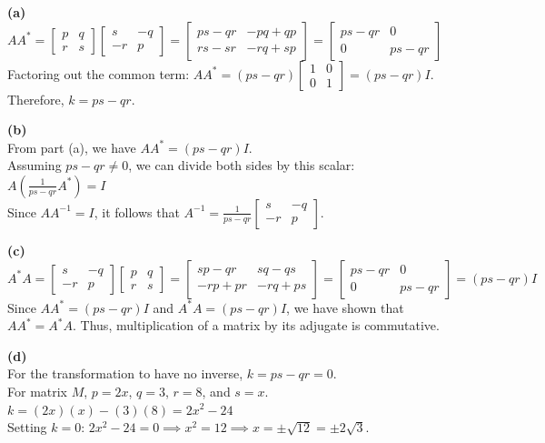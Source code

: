 \begin{solution}
\textbf{(a)} \\
$A A^* = \begin{bmatrix} p & q \\ r & s \end{bmatrix} \begin{bmatrix} s & -q \\ -r & p \end{bmatrix} = \begin{bmatrix} ps-qr & -pq+qp \\ rs-sr & -rq+sp \end{bmatrix} = \begin{bmatrix} ps-qr & 0 \\ 0 & ps-qr \end{bmatrix}$ \\
Factoring out the common term: $A A^* = (ps-qr)\begin{bmatrix} 1 & 0 \\ 0 & 1 \end{bmatrix} = (ps-qr)I$. \\
Therefore, $k = ps - qr$.

\medskip
\textbf{(b)} \\
From part (a), we have $A A^* = (ps-qr)I$. \\
Assuming $ps-qr \neq 0$, we can divide both sides by this scalar: \\
$A \left( \frac{1}{ps-qr} A^* \right) = I$ \\
Since $A A^{-1} = I$, it follows that $A^{-1} = \frac{1}{ps-qr} \begin{bmatrix} s & -q \\ -r & p \end{bmatrix}$.

\medskip
\textbf{(c)} \\
$A^* A = \begin{bmatrix} s & -q \\ -r & p \end{bmatrix} \begin{bmatrix} p & q \\ r & s \end{bmatrix} = \begin{bmatrix} sp-qr & sq-qs \\ -rp+pr & -rq+ps \end{bmatrix} = \begin{bmatrix} ps-qr & 0 \\ 0 & ps-qr \end{bmatrix} = (ps-qr)I$ \\
Since $A A^* = (ps-qr)I$ and $A^* A = (ps-qr)I$, we have shown that $A A^* = A^* A$. Thus, multiplication of a matrix by its adjugate is commutative.

\medskip
\textbf{(d)} \\
For the transformation to have no inverse, $k = ps - qr = 0$. \\
For matrix $M$, $p = 2x$, $q = 3$, $r = 8$, and $s = x$. \\
$k = (2x)(x) - (3)(8) = 2x^2 - 24$ \\
Setting $k = 0$: $2x^2 - 24 = 0 \implies x^2 = 12 \implies x = \pm\sqrt{12} = \pm2\sqrt{3}$.
\end{solution}

